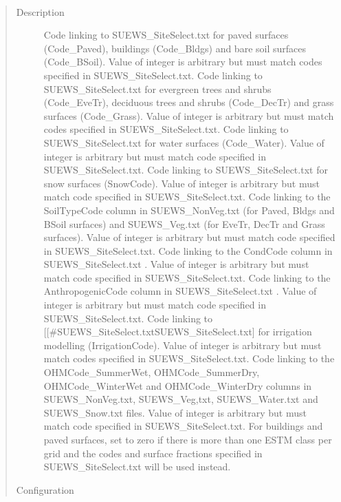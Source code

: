 \documentclass[letterpaper,10pt,english]{sphinxmanual}
\begin{document}
\begin{fulllineitems}
\label{\detokenize{input_files/SUEWS_SiteInfo/Input_Options:cmdoption-arg-code}}~\begin{quote}\begin{description}
\item[{Description}] \leavevmode
Code linking to SUEWS\_SiteSelect.txt for paved surfaces (Code\_Paved), buildings (Code\_Bldgs) and bare soil surfaces (Code\_BSoil). Value of integer is arbitrary but must match codes specified in SUEWS\_SiteSelect.txt.  Code linking to SUEWS\_SiteSelect.txt for evergreen trees and shrubs (Code\_EveTr), deciduous trees and shrubs (Code\_DecTr) and grass surfaces (Code\_Grass). Value of integer is arbitrary but must match codes specified in SUEWS\_SiteSelect.txt.  Code linking to SUEWS\_SiteSelect.txt for water surfaces (Code\_Water). Value of integer is arbitrary but must match code specified in SUEWS\_SiteSelect.txt.  Code linking to SUEWS\_SiteSelect.txt for snow surfaces (SnowCode). Value of integer is arbitrary but must match code specified in SUEWS\_SiteSelect.txt.  Code linking to the SoilTypeCode column in SUEWS\_NonVeg.txt (for Paved, Bldgs and BSoil surfaces) and SUEWS\_Veg.txt (for EveTr, DecTr and Grass surfaces). Value of integer is arbitrary but must match code specified in SUEWS\_SiteSelect.txt.  Code linking to the CondCode column in SUEWS\_SiteSelect.txt . Value of integer is arbitrary but must match code specified in SUEWS\_SiteSelect.txt.  Code linking to the AnthropogenicCode column in SUEWS\_SiteSelect.txt . Value of integer is arbitrary but must match code specified in SUEWS\_SiteSelect.txt.  Code linking to {[}{[}\#SUEWS\_SiteSelect.txt\textbar{}SUEWS\_SiteSelect.txt{]} for irrigation modelling (IrrigationCode). Value of integer is arbitrary but must match codes specified in SUEWS\_SiteSelect.txt.  Code linking to the OHMCode\_SummerWet, OHMCode\_SummerDry, OHMCode\_WinterWet and OHMCode\_WinterDry columns in SUEWS\_NonVeg.txt, SUEWS\_Veg,txt, SUEWS\_Water.txt and SUEWS\_Snow.txt files. Value of integer is arbitrary but must match code specified in SUEWS\_SiteSelect.txt.  For buildings and paved surfaces, set to zero if there is more than one ESTM class per grid and the codes and surface fractions specified in SUEWS\_SiteSelect.txt will be used instead.

\item[{Configuration}] \leavevmode


\end{description}
\end{quote}
\end{fulllineitems}
\end{document}
